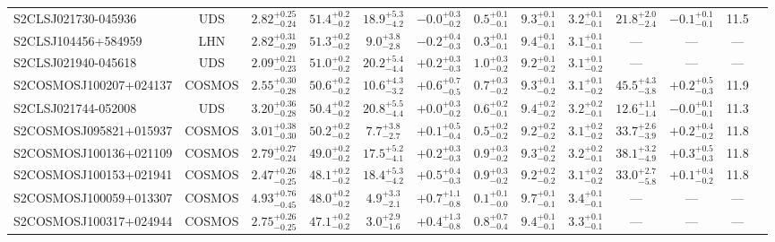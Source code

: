 \documentclass[a4paper, fleqn, usenatbib]{mnras}
\begin{document}
\begin{landscape}
\begin{table}
\begin{tabular}{l c c c c c c c c c c c c}
        S2CLSJ021730-045936 & UDS & $2.82^{+0.25}_{-0.24}$ & $51.4^{+0.2}_{-0.2}$ & $18.9^{+5.3}_{-4.2}$ & $-0.0^{+0.3}_{-0.2}$ & $0.5^{+0.1}_{-0.1}$ & $9.3^{+0.1}_{-0.1}$ & $3.2^{+0.1}_{-0.1}$ & $21.8^{+2.0}_{-2.4}$ & $-0.1^{+0.1}_{-0.1}$ & 11.5\\
        S2CLSJ104456+584959 & LHN & $2.82^{+0.31}_{-0.29}$ & $51.3^{+0.2}_{-0.2}$ & $9.0^{+3.8}_{-2.8}$ & $-0.2^{+0.4}_{-0.3}$ & $0.3^{+0.1}_{-0.1}$ & $9.4^{+0.1}_{-0.1}$ & $3.1^{+0.1}_{-0.1}$ & --- & --- & ---\\
        S2CLSJ021940-045618 & UDS & $2.09^{+0.21}_{-0.23}$ & $51.0^{+0.2}_{-0.2}$ & $20.2^{+5.4}_{-4.4}$ & $+0.2^{+0.3}_{-0.3}$ & $1.0^{+0.3}_{-0.2}$ & $9.2^{+0.1}_{-0.2}$ & $3.1^{+0.1}_{-0.2}$ & --- & --- & ---\\
        S2COSMOSJ100207+024137 & COSMOS & $2.55^{+0.30}_{-0.28}$ & $50.6^{+0.2}_{-0.2}$ & $10.6^{+4.3}_{-3.2}$ & $+0.6^{+0.7}_{-0.5}$ & $0.7^{+0.3}_{-0.2}$ & $9.3^{+0.1}_{-0.2}$ & $3.1^{+0.1}_{-0.2}$ & $45.5^{+4.3}_{-3.8}$ & $+0.2^{+0.5}_{-0.3}$ & 11.9\\
        S2CLSJ021744-052008 & UDS & $3.20^{+0.36}_{-0.28}$ & $50.4^{+0.2}_{-0.2}$ & $20.8^{+5.5}_{-4.4}$ & $+0.0^{+0.3}_{-0.2}$ & $0.6^{+0.2}_{-0.1}$ & $9.4^{+0.2}_{-0.2}$ & $3.2^{+0.2}_{-0.1}$ & $12.6^{+1.1}_{-1.4}$ & $-0.0^{+0.1}_{-0.1}$ & 11.3\\
        S2COSMOSJ095821+015937 & COSMOS & $3.01^{+0.38}_{-0.30}$ & $50.2^{+0.2}_{-0.2}$ & $7.7^{+3.8}_{-2.7}$ & $+0.1^{+0.5}_{-0.4}$ & $0.5^{+0.2}_{-0.2}$ & $9.2^{+0.2}_{-0.2}$ & $3.1^{+0.2}_{-0.2}$ & $33.7^{+2.6}_{-3.9}$ & $+0.2^{+0.4}_{-0.2}$ & 11.8\\
        S2COSMOSJ100136+021109 & COSMOS & $2.79^{+0.27}_{-0.24}$ & $49.0^{+0.2}_{-0.2}$ & $17.5^{+5.2}_{-4.1}$ & $+0.2^{+0.3}_{-0.3}$ & $0.9^{+0.3}_{-0.2}$ & $9.3^{+0.2}_{-0.2}$ & $3.2^{+0.2}_{-0.1}$ & $38.1^{+3.2}_{-4.9}$ & $+0.3^{+0.5}_{-0.3}$ & 11.8\\
        S2COSMOSJ100153+021941 & COSMOS & $2.47^{+0.26}_{-0.25}$ & $48.1^{+0.2}_{-0.2}$ & $18.4^{+5.3}_{-4.2}$ & $+0.5^{+0.4}_{-0.3}$ & $0.9^{+0.3}_{-0.2}$ & $9.2^{+0.2}_{-0.2}$ & $3.1^{+0.2}_{-0.2}$ & $33.0^{+2.7}_{-5.8}$ & $+0.1^{+0.4}_{-0.2}$ & 11.8\\
        S2COSMOSJ100059+013307 & COSMOS & $4.93^{+0.76}_{-0.45}$ & $48.0^{+0.2}_{-0.2}$ & $4.9^{+3.3}_{-2.1}$ & $+0.7^{+1.1}_{-0.8}$ & $0.1^{+0.1}_{-0.0}$ & $9.7^{+0.1}_{-0.1}$ & $3.4^{+0.1}_{-0.1}$ & --- & --- & ---\\
        S2COSMOSJ100317+024944 & COSMOS & $2.75^{+0.26}_{-0.25}$ & $47.1^{+0.2}_{-0.2}$ & $3.0^{+2.9}_{-1.6}$ & $+0.4^{+1.3}_{-0.8}$ & $0.8^{+0.7}_{-0.4}$ & $9.4^{+0.1}_{-0.1}$ & $3.3^{+0.1}_{-0.1}$ & --- & --- & ---\\

\end{tabular}
\end{table}
\end{landscape}
\end{document}
